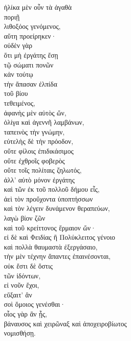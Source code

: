 {\large
\begin{greek}
\noindent ἡλίκα μὲν οὖν τὰ ἀγαθὰ \\
ποριῇ \\
\tabto{2em} λιθοξόος γενόμενος, \\
αὕτη προείρηκεν· \\
\tabto{2em} οὐδὲν γὰρ \\
\tabto{4em} ὅτι μὴ ἐργάτης ἔσῃ \\
\tabto{6em} τῷ σώματι πονῶν \\
\tabto{4em} κἀν τούτῳ \\
\tabto{4em} τὴν ἅπασαν ἐλπίδα \\
\tabto{6em} τοῦ βίου \\
\tabto{4em} τεθειμένος, \\
\tabto{4em} ἀφανὴς μὲν αὐτὸς ὤν,\\
\tabto{6em} ὀλίγα καὶ ἀγεννῆ λαμβάνων, \\
\tabto{6em} ταπεινὸς τὴν γνώμην, \\
\tabto{6em} εὐτελὴς δὲ τὴν πρόοδον, \\
\tabto{6em} οὔτε φίλοις ἐπιδικάσιμος\\
\tabto{6em} οὔτε ἐχθροῖς φοβερὸς \\
\tabto{6em} οὔτε τοῖς πολίταις ζηλωτός, \\
\tabto{6em} ἀλλ' αὐτὸ μόνον ἐργάτης \\
\tabto{8em} καὶ τῶν ἐκ τοῦ πολλοῦ δήμου εἷς, \\
\tabto{8em} ἀεὶ τὸν προὔχοντα ὑποπτήσσων \\
\tabto{8em} καὶ τὸν λέγειν δυνάμενον θεραπεύων, \\
\tabto{8em} λαγὼ βίον ζῶν \\
\tabto{8em} καὶ τοῦ κρείττονος ἕρμαιον ὤν· \\
\tabto{4em} εἰ δὲ καὶ Φειδίας ἢ Πολύκλειτος γένοιο \\
\tabto{6em} καὶ πολλὰ θαυμαστὰ ἐξεργάσαιο, \\
\tabto{4em} τὴν μὲν τέχνην ἅπαντες ἐπαινέσονται, \\
\tabto{4em} οὐκ ἔστι δὲ ὅστις \\
\tabto{6em} τῶν ἰδόντων, \\
\tabto{8em} εἰ νοῦν ἔχοι, \\
\tabto{4em} εὔξαιτ' ἂν \\
\tabto{6em} σοὶ ὅμοιος γενέσθαι· \\
οἷος γὰρ ἂν ᾖς, \\
\tabto{2em} βάναυσος καὶ χειρῶναξ καὶ ἀποχειροβίωτος \\
νομισθήσῃ.\\

\end{greek}
}

